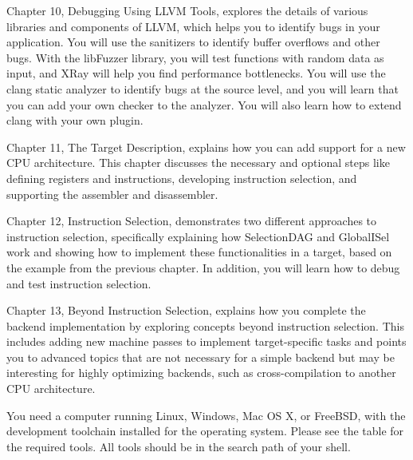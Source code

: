 Chapter 10, Debugging Using LLVM Tools, explores the details of various libraries and components of LLVM, which helps you to identify bugs in your application. You will use the sanitizers to identify buffer overflows and other bugs. With the libFuzzer library, you will test functions with random data as input, and XRay will help you find performance bottlenecks. You will use the clang static analyzer to identify bugs at the source level, and you will learn that you can add your own checker to the analyzer. You will also learn how to extend clang with your own plugin.

Chapter 11, The Target Description, explains how you can add support for a new CPU architecture. This chapter discusses the necessary and optional steps like defining registers and instructions, developing instruction selection, and supporting the assembler and disassembler.

Chapter 12, Instruction Selection, demonstrates two different approaches to instruction selection, specifically explaining how SelectionDAG and GlobalISel work and showing how to implement these functionalities in a target, based on the example from the previous chapter. In addition, you will learn how to debug and test instruction selection.

Chapter 13, Beyond Instruction Selection, explains how you complete the backend implementation by exploring concepts beyond instruction selection. This includes adding new machine passes to implement target-specific tasks and points you to advanced topics that are not necessary for a simple backend but may be interesting for highly optimizing backends, such as cross-compilation to another CPU architecture.


You need a computer running Linux, Windows, Mac OS X, or FreeBSD, with the development toolchain installed for the operating system. Please see the table for the required tools. All tools should be in the search path of your shell.

